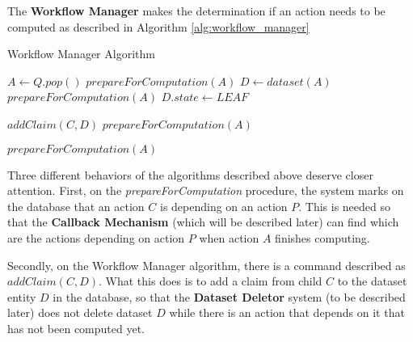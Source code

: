 The \textbf{Workflow Manager} makes the determination if an action needs to be computed as described in Algorithm \ref{alg:workflow_manager}

\begin{algorithm}
\begin{singlespace}
\caption{Workflow Manager Algorithm}
\label{alg:workflow_manager}
\begin{algorithmic}[1]
\State $A \gets Q.pop()$ 
	\State $prepareForComputation(A)$
\Else
	\State $D \gets dataset(A)$ 
		\State $prepareForComputation(A)$
	\Else
				\State $D.state \gets LEAF$ 
				
			\EndIf
			
					\State $addClaim(C, D)$ 		
						\State $prepareForComputation(A)$
					\EndIf
				\EndIf
			
			\EndFor
		\Else
				\State $prepareForComputation(A)$
			\EndIf
		\EndIf
	\EndIf
\EndIf
\EndProcedure
\end{algorithmic}
\end{singlespace}
\end{algorithm}

Three different behaviors of the algorithms described above deserve closer attention. First, on the \textit{prepareForComputation} procedure, the system marks on the database that an action $C$ is depending on an action $P$. This is needed so that the \textbf{Callback Mechanism} (which will be described later) can find which are the actions depending on action $P$ when action $A$ finishes computing.

Secondly, on the Workflow Manager algorithm, there is a command described as $addClaim(C, D)$. What this does is to add a claim from child $C$ to the dataset entity $D$ in the database, so that the \textbf{Dataset Deletor} system (to be described later) does not delete dataset $D$ while there is an action that depends on it that has not been computed yet.

